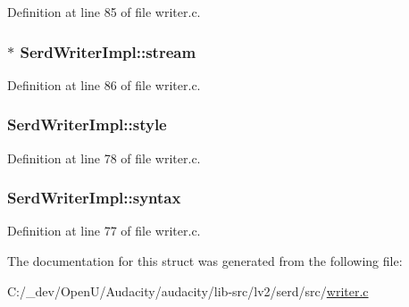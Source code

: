 Definition at line 85 of file writer.\+c.

\subsubsection[{\texorpdfstring{stream}{stream}}]{$\ast$ Serd\+Writer\+Impl\+::stream}\hypertarget{struct_serd_writer_impl_ab62fceebc408a6d4762ef81ef69c958c}{}\label{struct_serd_writer_impl_ab62fceebc408a6d4762ef81ef69c958c}


Definition at line 86 of file writer.\+c.

\subsubsection[{\texorpdfstring{style}{style}}]{ Serd\+Writer\+Impl\+::style}\hypertarget{struct_serd_writer_impl_a731bcb7aa9fdd36e19e9e857b9a75b57}{}\label{struct_serd_writer_impl_a731bcb7aa9fdd36e19e9e857b9a75b57}


Definition at line 78 of file writer.\+c.

\subsubsection[{\texorpdfstring{syntax}{syntax}}]{ Serd\+Writer\+Impl\+::syntax}\hypertarget{struct_serd_writer_impl_a7db3f4393ea64d07533d64024757f165}{}\label{struct_serd_writer_impl_a7db3f4393ea64d07533d64024757f165}


Definition at line 77 of file writer.\+c.



The documentation for this struct was generated from the following file\+:\begin{DoxyCompactItemize}
\item 
C\+:/\+\_\+dev/\+Open\+U/\+Audacity/audacity/lib-\/src/lv2/serd/src/\hyperlink{writer_8c}{writer.\+c}\end{DoxyCompactItemize}

